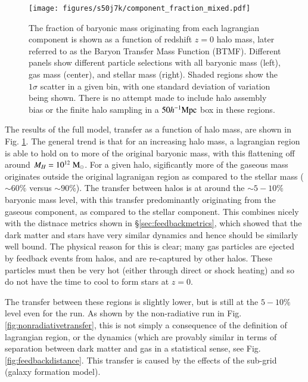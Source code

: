 \begin{figure}
	\centering
	\texttt{[image: figures/s50j7k/component\_fraction\_mixed.pdf]}
	\vspace{-0.7cm}
	\caption{
		The fraction of baryonic mass originating from each lagrangian component is
		shown as a function of redshift $z=0$ halo mass, later referred to as the
		Baryon Transfer Mass Function (BTMF). Different panels show different
		particle selections with all baryonic
		mass (left), gas mass (center), and stellar mass (right). Shaded
		regions show the $1\sigma$ scatter in a given bin, with one standard
		deviation of variation being shown. There is no attempt made to include
		halo assembly bias or the finite halo sampling in a $50h^{-1}{\rm Mpc}{}$ box in
		these regions.
	}
	\label{fig:maintransferresult}
\end{figure}

The results of the full model, transfer as a function of halo mass, are shown in Fig.
\ref{fig:maintransferresult}. The general trend is that for an increasing halo mass,
a lagrangian region is able to hold on to more of the original baryonic mass, with
this flattening off around $M_H = 10^{12} \;{\rm M}_{\odot}$. For a given halo, sigificantly
more of the gaseous mass originates outside the original lagranigan region as compared
to the stellar mass ($\sim 60 \%$ versus $\sim 90 \%$). The transfer between halos is
at around the $\sim 5-10\%$ baryonic mass level, with this transfer predominantly
originating from the gaseous component, as compared to the stellar component. This combines
nicely with the distnace metrics shown in \S \ref{sec:feedbackmetrics}, which
showed that the dark matter and stars have very similar dynamics and hence should be
similarly well bound. The physical reason for this is clear; many gas particles are ejected
by feedback events from halos, and are re-captured by other halos. These particles must then
be very hot (either through direct or shock heating) and so do not have the time to cool to
form stars at $z=0$.

The transfer between these regions is slightly lower, but is still at the $5-10\%$ level
even for the \nojet{} run. As shown by the non-radiative run in Fig. \ref{fig:nonradiativetransfer}, this is not simply a consequence of the definition of lagrangian region, or the dynamics (which are provably similar in terms of separation between dark matter and gas in a statistical sense, see Fig. \ref{fig:feedbackdistance}. This transfer is caused by the effects of the sub-grid (galaxy formation model).

